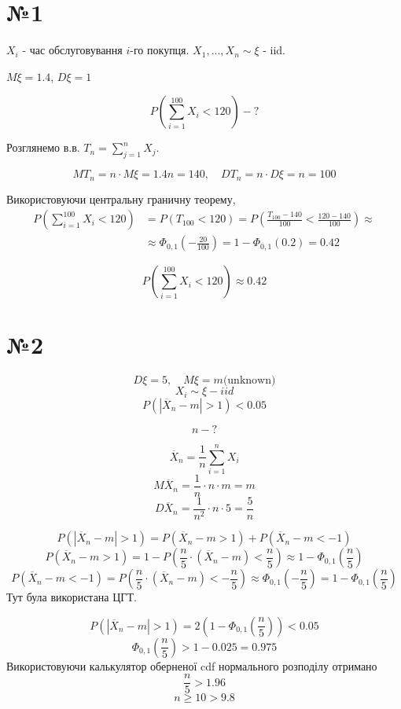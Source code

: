\documentclass[11pt, a4paper]{article} %
\begin{document}
\section*{№1}
\begin{mdframed}
    $X_i$ - час обслуговування $i$-го покупця. $X_1, ..., X_n \sim \xi$ - iid.

    $M\xi = 1.4$, $D\xi = 1$

    $$P(\sum_{i=1}^{100} X_i < 120) - ?$$
\end{mdframed}

Розглянемо в.в. $T_n = \sum_{j=1}^n X_j$.

$$MT_n = n \cdot M\xi = 1.4n = 140, \quad DT_n = n \cdot D\xi = n = 100$$

Використовуючи центральну граничну теорему,
\begin{align*}
P(\sum_{i=1}^{100} X_i < 120) &= P(T_100 < 120) = P(\frac{T_100 - 140}{100} < \frac{120 - 140}{100}) \approx \\
&\approx \Phi_{0,1}(-\frac{20}{100}) = 1-\Phi_{0,1}(0.2) = 0.42
\end{align*}

\begin{mdframed}[style=ans]
    $$P(\sum_{i=1}^{100} X_i < 120) \approx 0.42$$
\end{mdframed}

\section*{№2}
\begin{mdframed}
    $$D\xi = 5, \quad M\xi = m \text{(unknown)}$$
    $$X_i \sim \xi - iid$$
    $$P(|\overline X_n - m| > 1) < 0.05$$

    $$n - ?$$
\end{mdframed}

$$\overline X_n = \frac{1}{n} \sum_{i=1}^n X_i$$
$$M\overline X_n = \frac{1}{n} \cdot n \cdot m = m$$
$$D\overline X_n = \frac{1}{n^2} \cdot n \cdot 5 = \frac{5}{n}$$

$$P(|\overline X_n - m| > 1) = P(\overline X_n - m > 1) + P(\overline X_n - m < -1)$$
$$P(\overline X_n - m > 1) = 1 - P(\frac{n}{5} \cdot (\overline X_n - m) < \frac{n}{5}) \approx 1 - \Phi_{0,1}\left(\frac{n}{5}\right)$$
$$P(\overline X_n - m < -1) = P(\frac{n}{5} \cdot (\overline X_n - m) < -\frac{n}{5}) \approx \Phi_{0,1}\left(-\frac{n}{5}\right) = 1 - \Phi_{0,1}\left(\frac{n}{5}\right)$$
Тут була використана ЦГТ.

$$P(|\overline X_n - m| > 1) = 2\left(1 - \Phi_{0,1}\left(\frac{n}{5}\right)\right) < 0.05$$
$$\Phi_{0,1}\left(\frac{n}{5}\right) > 1-0.025 = 0.975$$
Використовуючи калькулятор оберненої cdf нормального розподілу отримано
$$\frac{n}{5} > 1.96$$
$$n \ge 10 > 9.8$$
\end{document}
